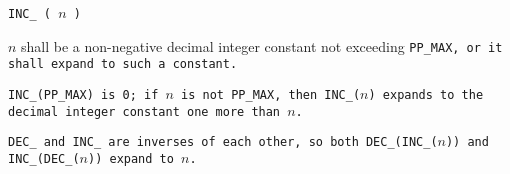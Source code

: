 
\tt{INC_ (} $n$ \tt{)}


$n$ shall be a non-negative decimal integer constant not exceeding \tt{PP_MAX},
or it shall expand to such a constant.


\tt{INC_(PP_MAX)} is \tt{0}; if $n$ is not \tt{PP_MAX}, then
\tt{INC_(}$n$\tt{)} expands to the decimal integer constant one more than $n$.

\note \tt{DEC_} and \tt{INC_} are inverses of each other,
so both \tt{DEC_(INC_(}$n$\tt{))} and \tt{INC_(DEC_(}$n$\tt{))} expand to $n$.
